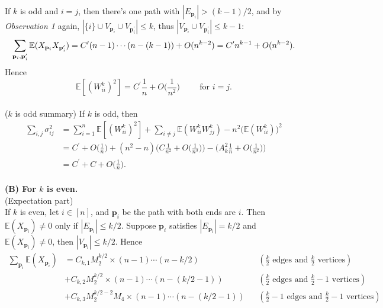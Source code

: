 \begin{answer}
If $k$ is odd and $i=j$, then there's one path with $|E_{\mathbf{p}_i}|>(k-1)/2$, and by \textit{Observation 1} again, $|\{i\}\cup V_{\mathbf{p}_i}\cup V_{\mathbf{p}^\prime_i}|\leq k$, thus $|V_{\mathbf{p}_i}\cup V_{\mathbf{p}^\prime_i}|\leq k-1$:
\begin{equation*}
    \sum_{\mathbf{p}_i\\,\mathbf{p}^\prime_i}\mathbb{E}(X_{\mathbf{p}_i}X_{\mathbf{p}^\prime_i})=C^\prime (n-1)\cdots(n-(k-1))+O(n^{k-2})
    =C^\prime n^{k-1}+O(n^{k-2}).
\end{equation*}
Hence 
\begin{equation*}
    \mathbb{E}[(W_{ii}^k)^2]=C^\prime\frac{1}{n}+O\Big(\frac{1}{n^2}\Big)\hspace{1cm}\text{for }i= j.
\end{equation*}\\
($k$ is odd summary) If $k$ is odd, then
\begin{equation*}
\begin{aligned}
    \sum_{i,j}\sigma_{ij}^2&=\sum_{i=1}^n\mathbb{E}[(W_{ii}^k)^2]+\sum_{i\neq j}\mathbb{E}(W_{ii}^kW_{jj}^k)-n^2\Big(\mathbb{E}(W_{ii}^k)\Big)^2\\&
    =C^\prime+O\Big(\frac{1}{n}\Big)+(n^2-n)\Big(C\frac{1}{n^2}+O\Big(\frac{1}{n^3}\Big)\Big)-\Big(A_k^2\frac{1}{n}+O\Big(\frac{1}{n^2}\Big)\Big)\\&
    =C^\prime+C+O\Big(\frac{1}{n}\Big).
\end{aligned}
\end{equation*}\\
\textbf{(B) For $k$ is even.}\\
(Expectation part)\\
If $k$ is even, let $i\in[n]$, and $\mathbf{p}_i$ be the path with both ends are $i$. Then $\mathbb{E}(X_{\mathbf{p}_i})\neq 0$ only if $|E_{\mathbf{p}_i}|\leq k/2$. Suppose $\mathbf{p}_i$ satisfies $|E_{\mathbf{p}_i}|= k/2$ and $\mathbb{E}(X_{\mathbf{p}_i})\neq 0$, then $|V_{\mathbf{p}_i}|\leq k/2$. Hence
\begin{equation*}
\begin{aligned}
    \sum_{\mathbf{p}_i}\mathbb{E}(X_{\mathbf{p}_i})&=C_{k,1}M_2^{k/2}\times(n-1)\cdots(n-k/2) && (\frac{k}{2} \text{ edges and }\frac{k}{2}\text{ vertices})\\&
    + C_{k,2}M_2^{k/2}\times(n-1)\cdots(n-(k/2-1)) && (\frac{k}{2}\text{ edges and }\frac{k}{2}-1\text{ vertices})\\&
    + C_{k,3}M_2^{k/2-2}M_4\times(n-1)\cdots(n-(k/2-1)) && (\frac{k}{2}-1 \text{ edges and }\frac{k}{2}-1\text{ vertices}) \\&

\end{aligned}
\end{equation*}
\end{answer}

